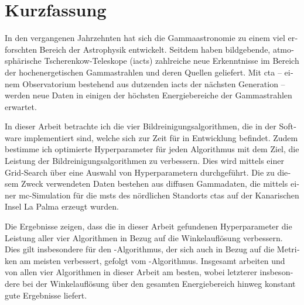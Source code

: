 \section*{Kurzfassung}
\begin{otherlanguage}{ngerman}
In den vergangenen Jahrzehnten hat sich die Gammaastronomie zu einem viel erforschten Bereich der
Astrophysik entwickelt. Seitdem haben bildgebende, atmosphärische Tscherenkow-Teleskope (\glspl{iact})
zahlreiche neue Erkenntnisse im Bereich der hochenergetischen Gammastrahlen und deren Quellen geliefert.
Mit \gls{cta} -- einem Observatorium bestehend aus dutzenden \glspl{iact} der nächsten Generation -- werden neue Daten in einigen der höchsten
Energiebereiche der Gammastrahlen erwartet.

In dieser Arbeit betrachte ich die vier Bildreinigungsalgorithmen, die in der Software \ctapipe{} implementiert
sind, welche sich zur Zeit für \cta{} in Entwicklung befindet. Zudem bestimme ich optimierte
Hyperparameter für jeden Algorithmus mit dem Ziel, die Leistung der Bildreinigungsalgorithmen zu verbessern.
Dies wird mittels einer Grid-Search über eine Auswahl von Hyperparametern durchgeführt. Die zu diesem
Zweck verwendeten Daten bestehen aus diffusen Gammadaten, die mittels einer \gls{mc}-Simulation für die
\glspl{mst} des nördlichen Standorts \gls{cta}s auf der Kanarischen Insel La Palma erzeugt wurden.

Die Ergebnisse zeigen, dass die in dieser Arbeit gefundenen Hyperparameter die Leistung aller vier
Algorithmen in Bezug auf die Winkelauflösung verbessern. Dies gilt insbesondere für den \tcc{}-Algorithmus,
der sich auch in Bezug auf die Metriken am meisten verbessert, gefolgt vom \mars{}-Algorithmus.
Insgesamt arbeiten \fact{} und \mars{} von allen vier Algorithmen in dieser Arbeit am besten, wobei
letzterer insbesondere bei der Winkelauflösung über den gesamten Energiebereich hinweg
konstant gute Ergebnisse liefert.
\end{otherlanguage}
\glsresetall%
